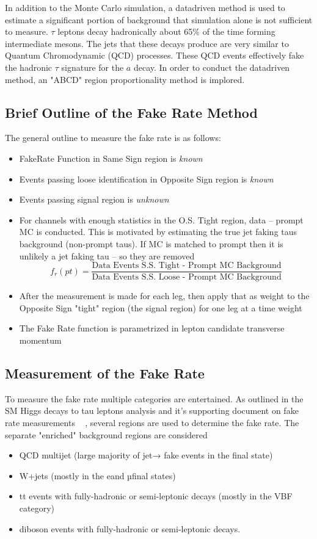 In addition to the Monte Carlo simulation, a datadriven method is used to estimate a significant portion of background that simulation alone is not sufficient to measure. $\tau$ leptons decay hadronically about 65\% of the time forming intermediate mesons. The jets that these decays produce are very similar to Quantum Chromodynamic (QCD) processes. These QCD events effectively fake the hadronic $\tau$ signature for the $a$ decay. In order to conduct the datadriven method, an "ABCD" region proportionality method is implored. 

\subsection{Brief Outline of the Fake Rate Method}
The general outline to measure the fake rate is as follows:
\begin{itemize}
\item{FakeRate Function in Same Sign 
region is \textit{known}}
\item{Events passing loose identification in Opposite 
Sign region is \textit{known} }
\item{Events passing signal region is 
\textit{unknown}}
\item{For channels with enough statistics in the O.S. Tight region, 
data – prompt MC is conducted. This is motivated by estimating the true jet faking taus background (non-prompt taus). If MC is matched to prompt then it is unlikely a jet faking tau – so they are removed }
\[f_r(pt)=\frac{\text{Data Events S.S. Tight - Prompt MC Background}}{\text{Data Events S.S. Loose - Prompt MC Background}}\] 
\item{After the measurement is 
made for each leg, then apply that as weight to the Opposite Sign "tight" region (the signal region) for one leg at a time weight}
\item{The Fake Rate function is parametrized in lepton candidate transverse momentum}
\end{itemize}

\subsection{Measurement of the Fake Rate}
To measure the fake rate multiple categories are entertained. As outlined in the SM Higgs decays to tau leptons analysis and it's supporting document on fake rate measurements ~\cite{AN16355} , several regions are used to determine the fake rate. The separate "enriched" background regions are considered 
\begin{itemize}
	\item QCD multijet (large majority of jet→ \tauh fake events in the \tauh \tauh final state)
	\item W+jets (mostly in the e\tauh and µ\tauh final states)
	\item tt events with fully-hadronic or semi-leptonic decays (mostly in the VBF category)
	\item diboson events with fully-hadronic or semi-leptonic decays.
\end{itemize} 

